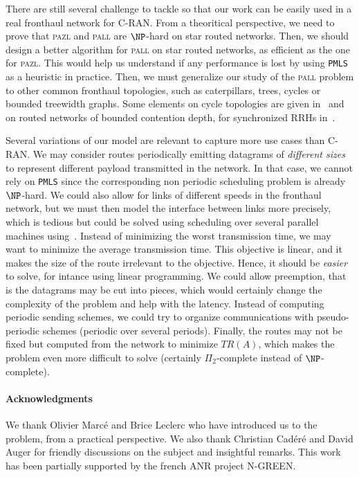 \documentclass[a4paper,10pt]{journal}
\newcommand\PMLS{\texttt{PMLS}\xspace}
\newcommand\pazl{\textsc{pazl}\xspace}
\newcommand\pall{\textsc{pall}\xspace}
\begin{document}
 	There are still several challenge to tackle so that our work can be easily used in a real 
 	fronthaul network for C-RAN.
  	From a theoritical perspective, we need to prove that \pazl and \pall are $\NP$-hard on star routed networks. Then, we should design a better \FPT algorithm for \pall on star routed networks, as efficient as the one for \pazl. This would help us understand if any performance is lost by using \PMLS as a heuristic in practice. Then, we must generalize our study of the \pall problem to other common fronthaul topologies, such as caterpillars, trees, cycles or bounded treewidth graphs. Some elements on cycle topologies are given in~\cite{DBLP:conf/ondm/BarthGS19} and on routed networks of bounded contention depth, for synchronized RRHs in~\cite{guiraud2020synchronized}.

   	Several variations of our model are relevant to capture more use cases than C-RAN. 
   	We may consider routes periodically emitting datagrams of \emph{different sizes} to represent different payload transmitted in the network. In that case, we cannot rely on \PMLS since the corresponding non periodic scheduling problem is already $\NP$-hard. 
   	We could also allow for links of different speeds in the fronthaul network, but we must then model
   	the interface between links more precisely, which is tedious but could be solved using scheduling over several parallel machines using~\cite{simons1989fast}.
	Instead of minimizing the worst transmission time, we may want to minimize the average transmission time. This objective is linear, and it makes the size of the route irrelevant to the objective. Hence, it should be \emph{easier} to solve, for intance using linear programming. We could allow preemption, that is the datagrams may be cut into pieces, which would certainly change the complexity of the problem and help with the latency.  
   	Instead of computing periodic sending schemes, we could try to organize communications with pseudo-periodic schemes (periodic over several periods). Finally, the routes may not be fixed but computed from the network to minimize $TR(A)$, which makes the problem even more difficult to solve (certainly $\Pi_2$-complete instead of $\NP$-complete). 



 	\paragraph*{Acknowledgments} 
 	We thank Olivier Marcé and Brice Leclerc who have introduced us to the problem, from a practical perspective. We also thank Christian Cad\'er\'e and David Auger for friendly discussions on the subject and insightful remarks. This work has been partially supported by the french ANR project N-GREEN.



\end{document}
